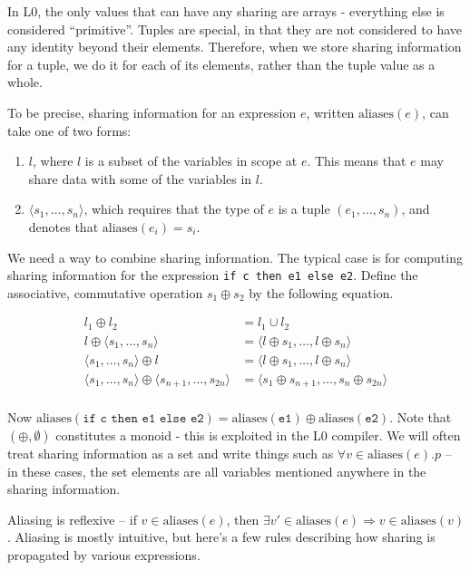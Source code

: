 \documentclass[oneside]{memoir}
\newcommand\aliases[1]{\textrm{aliases}(#1)}
\begin{document}
In L0, the only values that can have any sharing are arrays -
everything else is considered ``primitive''.  Tuples are special, in
that they are not considered to have any identity beyond their
elements.  Therefore, when we store sharing information for a tuple,
we do it for each of its elements, rather than the tuple value as a
whole.

To be precise, sharing information for an expression $e$, written
$\aliases{e}$, can take one of two forms:

\begin{enumerate}
\item $l$, where $l$ is a subset of the variables in scope at $e$.
  This means that $e$ may share data with some of the variables in
  $l$.

\item $\langle s_{1}, \ldots, s_{n} \rangle$, which requires that the
  type of $e$ is a tuple $(e_{1}, \ldots, s_{n})$, and denotes that
  $\aliases{e_{i}} = s_{i}$.
\end{enumerate}

We need a way to combine sharing information.  The typical case is for
computing sharing information for the expression \texttt{if c then e1
  else e2}.  Define the associative, commutative operation $s_{1}
\oplus s_{2}$ by the following equation.

\begin{align*}
  l_{1} \oplus l_{2} &= l_{1} \cup l_{2} \\
  l \oplus \langle s_{1}, \ldots, s_{n} \rangle &= \langle l \oplus s_1, \ldots, l \oplus s_n \rangle \\
   \langle s_{1}, \ldots, s_{n} \rangle \oplus l &= \langle l \oplus s_1, \ldots, l \oplus s_n \rangle \\
  \langle s_{1}, \ldots, s_{n} \rangle \oplus \langle s_{n+1}, \ldots, s_{2n} \rangle &= \langle s_{1} \oplus s_{n+1}, \ldots, s_{n} \oplus s_{2n} \rangle \\
\end{align*}

Now $\aliases{\texttt{if c then e1 else e2}} = \aliases{\texttt{e1}}
\oplus \aliases{\texttt{e2}}$.  Note that $(\oplus, \emptyset)$
constitutes a monoid - this is exploited in the L0 compiler.  We will
often treat sharing information as a set and write things such as
$\forall v\in\aliases{e}.p$ -- in these cases, the set elements are
all variables mentioned anywhere in the sharing information.

Aliasing is reflexive -- if $v\in\aliases{e}$, then $\exists
v'\in\aliases{e}\Rightarrow v\in\aliases{v}$.  Aliasing is mostly
intuitive, but here's a few rules describing how sharing is
propagated by various expressions.
\end{document}
